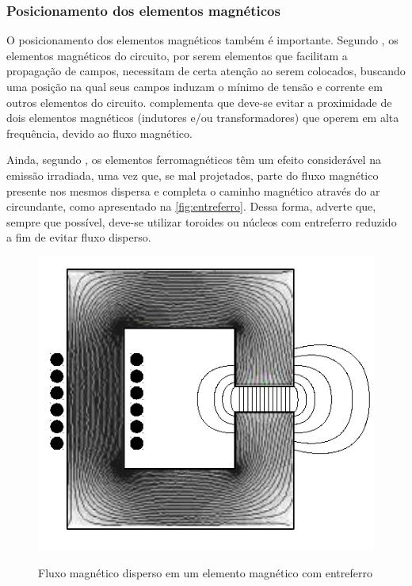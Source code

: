             \subsubsection{Posicionamento dos elementos magnéticos} \label{cap:fund_emc_conv_mitig_magn}
            
            O posicionamento dos elementos magnéticos também é importante. Segundo , os elementos magnéticos do circuito, por serem elementos que facilitam a propagação de campos, necessitam de certa atenção ao serem colocados, buscando uma posição na qual seus campos induzam o mínimo de tensão e corrente em outros elementos do circuito.  complementa que deve-se evitar a proximidade de dois elementos magnéticos (indutores e/ou transformadores) que operem em alta frequência, devido ao fluxo magnético. 
            
            Ainda, segundo , os elementos ferromagnéticos têm um efeito considerável na emissão irradiada, uma vez que, se mal projetados, parte do fluxo magnético presente nos mesmos dispersa e completa o caminho magnético através do ar circundante, como apresentado na \autoref{fig:entreferro}.
            Dessa forma,  adverte que, sempre que possível, deve-se utilizar toroides ou núcleos com entreferro reduzido a fim de evitar fluxo disperso. 
            
            \begin{figure}[H]
            	\centering
            	\caption{Fluxo magnético disperso em um elemento magnético com entreferro}
            	\includegraphics[scale=.8]{pdf/outros/entreferro.pdf}
            	\label{fig:entreferro}
            \end{figure}
            

